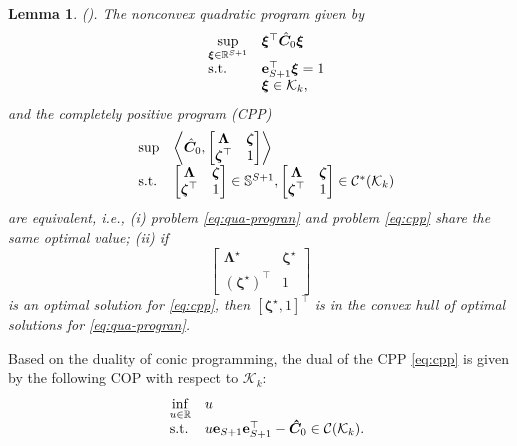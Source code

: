 \documentclass{article}
\newcommand{\st}{\textnormal{s.t.}}
\newcommand{\RR}{\mathbb{R}}
\newtheorem{lemma}{Lemma}
\begin{document}
\begin{lemma} \textup{(\cite[Corollary 8.3]{copositive-program}).} \label{lem2}
The nonconvex quadratic program given by
\begin{equation}
\label{eq:qua-progran}
\begin{array}{clll}
 & \displaystyle \sup_{\bm \xi \in \RR^{S+1}} & \bm \xi^\top \hat{\bm C}_0 \bm\xi \\
 &\st & \mathbf{e}_{S+1}^\top \bm \xi = 1\\
 & & \bm\xi \in  \mathcal K_k, \\
 \end{array}
\end{equation}
and the completely positive program (CPP)
\begin{equation}
\label{eq:cpp}
\begin{array}{clll}
 & \displaystyle \sup & \left \langle \hat{\bm C}_0, 
 \begin{bmatrix}
\bm \Lambda & \bm \zeta\\ 
 \bm \zeta^\top & 1 
\end{bmatrix} \right \rangle \\
 &\st & 
\begin{bmatrix}
\bm \Lambda & \bm \zeta\\ 
 \bm \zeta^\top & 1 
\end{bmatrix} \in \mathbb{S}^{S+1}, 
\begin{bmatrix}
\bm \Lambda & \bm \zeta\\ 
 \bm \zeta^\top & 1 
\end{bmatrix} \in \mathcal{C^*}(\mathcal{K}_k)\\
 \end{array}
\end{equation}
are equivalent, i.e., (i) problem \eqref{eq:qua-progran} and problem \eqref{eq:cpp} share the same optimal value; (ii) if 
$$\begin{bmatrix}
\bm \Lambda^{\star} & \bm \zeta^{\star}\\ 
(\bm \zeta^{\star})^\top & 1 
\end{bmatrix}$$
is an  optimal solution for \eqref{eq:cpp}, then $[\bm \zeta^{\star}, 1]^\top$ is in the convex hull of optimal solutions for \eqref{eq:qua-progran}.
\end{lemma}

Based on the duality of conic programming, the dual of the CPP \eqref{eq:cpp} is given by the following COP with respect to $\mathcal{K}_k$:
\begin{equation}
\label{eq:cop}
\begin{array}{cll}
 & \displaystyle \inf_{u \in \RR} & u\\
 &\st & u \mathbf{e}_{S+1} \mathbf{e}_{S+1}^\top 
 - \bm{\hat{C}}_0 \in \mathcal{C} (\mathcal K_k). \\
\end{array}
\end{equation}
\end{document}
